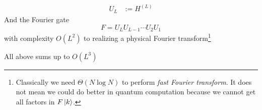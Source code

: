 \documentclass[11pt,a4paper]{article}%
\numberwithin{equation}{section}
\begin{document}
\begin{enumerate}
\begin{itemize}
\begin{itemize}
\begin{align}
                U_L &:= H^{(L)}
            \end{align}
            And the Fourier gate
            \begin{equation}
                F = U_L U_{L-1}\cdots U_2 U_1
            \end{equation}
            with complexity $O(L^2)$ to realizing a physical Fourier transform\footnote{Classically we need $\Theta(N\log N)$ to perform \emph{fast Fourier transform}. It does not mean we could do better in quantum computation because we cannot get all factors in $F\ket k$.}
        \end{itemize}
        All above sums up to $O(L^3)$
    \end{itemize}
\end{enumerate}
\end{document}
